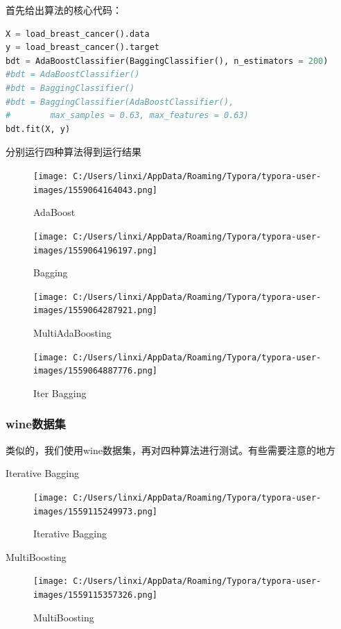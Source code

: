 \documentclass[UTF8]{ctexart}
\begin{document}
首先给出算法的核心代码：
\begin{lstlisting}[language=python]
X = load_breast_cancer().data
y = load_breast_cancer().target
bdt = AdaBoostClassifier(BaggingClassifier(), n_estimators = 200)
#bdt = AdaBoostClassifier()
#bdt = BaggingClassifier()
#bdt = BaggingClassifier(AdaBoostClassifier(), 
#        max_samples = 0.63, max_features = 0.63)
bdt.fit(X, y)
\end{lstlisting}

分别运行四种算法得到运行结果

\begin{figure}[htb]
	\centering
	\texttt{[image: C:/Users/linxi/AppData/Roaming/Typora/typora-user-images/1559064164043.png]}
	\caption{AdaBoost}
\end{figure}

\begin{figure}[htb]
	\centering
	\texttt{[image: C:/Users/linxi/AppData/Roaming/Typora/typora-user-images/1559064196197.png]}
	\caption{Bagging}
\end{figure}

\begin{figure}[htb]
	\centering
	\texttt{[image: C:/Users/linxi/AppData/Roaming/Typora/typora-user-images/1559064287921.png]}
	\caption{MultiAdaBoosting}
\end{figure}

\begin{figure}[htb]
	\centering
	\texttt{[image: C:/Users/linxi/AppData/Roaming/Typora/typora-user-images/1559064887776.png]}
	\caption{Iter Bagging}
\end{figure}
\newpage
\subsubsection{wine数据集}
类似的，我们使用wine数据集，再对四种算法进行测试。有些需要注意的地方

Iterative Bagging

\begin{figure}[htb]
	\centering
	\texttt{[image: C:/Users/linxi/AppData/Roaming/Typora/typora-user-images/1559115249973.png]}
	\caption{Iterative Bagging}
\end{figure}

MultiBoosting

\begin{figure}[htb]
	\centering
	\texttt{[image: C:/Users/linxi/AppData/Roaming/Typora/typora-user-images/1559115357326.png]}
	\caption{MultiBoosting}
\end{figure}
\end{document}
